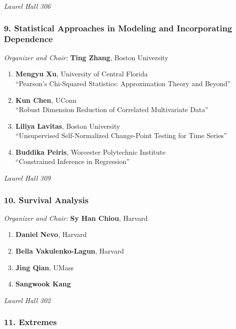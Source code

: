 \emph{Laurel Hall 306} \\[.5em]

\subsubsection*{9. Statistical Approaches in Modeling and Incorporating Dependence}

\emph{Organizer and Chair:} \textbf{Ting Zhang}, Boston University

\begin{enumerate}
\item \textbf{Mengyu Xu}, University of Central Florida \\
``Pearson’s Chi-Squared Statistics: Approximation Theory and Beyond''
\item \textbf{Kun Chen}, UConn \\
``Robust Dimension Reduction of Correlated Multivariate Data''
\item \textbf{Liliya Lavitas}, Boston University \\
``Unsupervised Self-Normalized Change-Point Testing for Time Series''
\item \textbf{Buddika Peiris}, Worcester Polytechnic Institute \\
``Constrained Inference in Regression''
\end{enumerate}

\emph{Laurel Hall 309} \\[.5em]

\subsubsection*{10. Survival Analysis}

\emph{Organizer and Chair:} \textbf{Sy Han Chiou}, Harvard

\begin{enumerate}
\item \textbf{Daniel Nevo}, Harvard 
\item \textbf{Bella Vakulenko-Lagun}, Harvard 
\item \textbf{Jing Qian}, UMass 
\item \textbf{Sangwook Kang} 
\end{enumerate}

\emph{Laurel Hall 302} \\[.5em]

\subsubsection*{11. Extremes}

